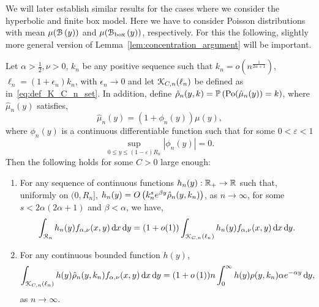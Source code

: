 We will later establish similar results for the cases where we consider the hyperbolic and finite box model. Here we have to consider Poisson distributions with mean $\mu({\mathcal B}\left(y\right))$ and $\mu({\mathcal B}_{\text{box}}\left(y\right))$, respectively. For this the following, slightly more general version of Lemma~\ref{lem:concentration_argument} will be important.

\begin{lemma}\label{lem:concentration_argument_rho_approximation}
Let $\alpha > \frac{1}{2}, \nu > 0$, $k_n$ be any positive sequence such that $k_n = o(n^{\frac{1}{2\alpha + 1}})$, $\ell_n = (1 + \epsilon_n)k_n$, with $\epsilon_n \to 0$ and let ${\mathcal K}_{C,n}(\ell_n)$ be defined as in~\eqref{eq:def_K_C_n_set}. In addition, define $\hat{\rho}_n(y,k) = \mathbb{P}\left({\mathrm{Po}}(\hat{\mu}_n(y)) = k\right)$, where $\hat{\mu}_n(y)$ satisfies, 
\[
	\hat{\mu}_n(y) = (1 + \phi_n(y))\mu(y),
\]
where $\phi_n(y)$ is a continuous differentiable function such that for some $0 < \varepsilon < 1$
\[
	\sup_{0 \le y \le (1 - \varepsilon)R_n} |\phi_n(y)| = 0.
\]
Then the following holds for some $C > 0$ large enough:
\begin{enumerate}
\item For any sequence of continuous functions $h_n(y) : {\mathbb R}_+ \to {\ensuremath{\mathbb R}}$ such that, uniformly on $(0,R_n]$, $h_n(y) = O\left(k_n^s e^{\beta y} \hat{\rho}_n(y,k_n)\right)$, as $n \to \infty$, 
for some $s < 2\alpha(2\alpha + 1)$ and $\beta < \alpha$, we have,
\[
	\int_{{\mathcal R}_n} h_n(y) f_{\alpha,\nu}(x,y) \operatorname{\mathrm{d}\hspace{-2pt}} x \operatorname{\mathrm{d}\hspace{-2pt}} y 
	= (1 + o(1)) \int_{{\mathcal K}_{C,n}(\ell_n)} h_n(y) f_{\alpha,\nu}(x,y) \operatorname{\mathrm{d}\hspace{-2pt}} x \operatorname{\mathrm{d}\hspace{-2pt}} y.
\]
\item For any continuous bounded function $h(y)$,
\[
	\int_{{\mathcal K}_{C,n}(\ell_n)} h(y) \hat{\rho}_n(y,k_n) f_{\alpha,\nu}(x,y) \operatorname{\mathrm{d}\hspace{-2pt}} x \operatorname{\mathrm{d}\hspace{-2pt}} y
	= (1+o\left(1\right)) n \int_{0}^\infty h(y) \rho(y,k_n) \alpha e^{-\alpha y} \operatorname{\mathrm{d}\hspace{-2pt}} y,
\]
as $n \to \infty$.
\end{enumerate}
\end{lemma}

